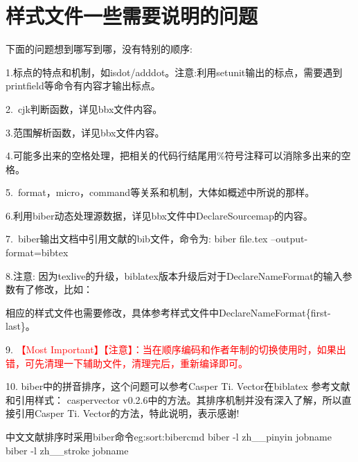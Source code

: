 \documentclass[11pt]{article} %
\begin{document}
\section{样式文件一些需要说明的问题}
下面的问题想到哪写到哪，没有特别的顺序:

1.标点的特点和机制，如isdot/adddot。注意:利用setunit输出的标点，需要遇到printfield等命令有内容才输出标点。

2.~cjk判断函数，详见bbx文件内容。

3.范围解析函数，详见bbx文件内容。

4.可能多出来的空格处理，把相关的代码行结尾用\%符号注释可以消除多出来的空格。

5.~format，micro，command等关系和机制，大体如概述中所说的那样。

6.利用biber动态处理源数据，详见bbx文件中DeclareSourcemap的内容。

7.~biber输出文档中引用文献的bib文件，命令为:
biber file.tex --output-format=bibtex

8.注意: 因为texlive的升级，biblatex版本升级后对于DeclareNameFormat的输入参数有了修改，比如：

相应的样式文件也需要修改，具体参考样式文件中DeclareNameFormat\{first-last\}。

9. \textcolor{red}{\HandRight \heiti 【Most Important】【注意】：当在顺序编码和作者年制的切换使用时，如果出错，可先清理一下辅助文件，清理完后，重新编译即可。}

10. {\heiti biber中的拼音排序，这个问题可以参考Casper Ti. Vector在biblatex 参考文献和引用样式： caspervector v0.2.6中的方法。其排序机制并没有深入了解，所以直接引用Casper Ti. Vector的方法，特此说明，表示感谢!}

\begin{codetex}{中文文献排序时采用biber命令}{eg:sort:bibercmd}
biber -l zh__pinyin jobname
biber -l zh__stroke jobname
\end{codetex}
\end{document}
